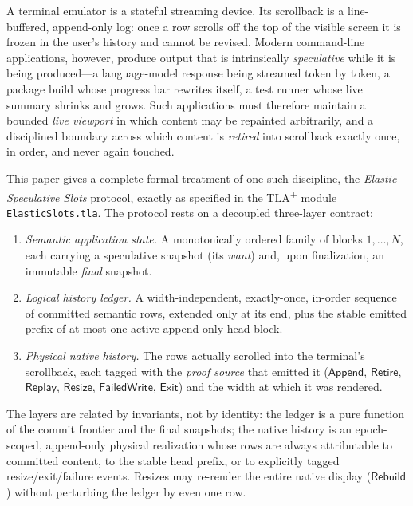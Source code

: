 \documentclass[11pt]{article}
\newcommand{\Rebuild}{\mathsf{Rebuild}}
\newcommand{\srcApp}{\mathsf{Append}}
\newcommand{\srcRet}{\mathsf{Retire}}
\newcommand{\srcRep}{\mathsf{Replay}}
\newcommand{\srcRsz}{\mathsf{Resize}}
\newcommand{\srcFail}{\mathsf{FailedWrite}}
\newcommand{\srcExit}{\mathsf{Exit}}
\theoremstyle{definition}
\theoremstyle{remark}
\begin{document}
A terminal emulator is a stateful streaming device. Its scrollback is a
line-buffered, append-only log: once a row scrolls off the top of the visible
screen it is frozen in the user's history and cannot be revised. Modern
command-line applications, however, produce output that is intrinsically
\emph{speculative} while it is being produced---a language-model response
being streamed token by token, a package build whose progress bar rewrites
itself, a test runner whose live summary shrinks and grows. Such applications
must therefore maintain a bounded \emph{live viewport} in which content may be
repainted arbitrarily, and a disciplined boundary across which content is
\emph{retired} into scrollback exactly once, in order, and never again
touched.

This paper gives a complete formal treatment of one such discipline, the
\emph{Elastic Speculative Slots} protocol, exactly as specified in the
TLA\textsuperscript{+} module \texttt{ElasticSlots.tla}. The protocol rests on
a decoupled three-layer contract:

\begin{enumerate}
\item \emph{Semantic application state.} A monotonically ordered family of
  blocks $1,\dots,N$, each carrying a speculative snapshot (its \emph{want})
  and, upon finalization, an immutable \emph{final} snapshot.
\item \emph{Logical history ledger.} A width-independent, exactly-once,
  in-order sequence of committed semantic rows, extended only at its end, plus
  the stable emitted prefix of at most one active append-only head block.
\item \emph{Physical native history.} The rows actually scrolled into the
  terminal's scrollback, each tagged with the \emph{proof source} that emitted
  it ($\srcApp$, $\srcRet$, $\srcRep$, $\srcRsz$, $\srcFail$, $\srcExit$) and
  the width at which it was rendered.
\end{enumerate}

The layers are related by invariants, not by identity: the ledger is a pure
function of the commit frontier and the final snapshots; the native history is
an epoch-scoped, append-only physical realization whose rows are always
attributable to committed content, to the stable head prefix, or to explicitly
tagged resize/exit/failure events. Resizes may re-render the entire native
display ($\Rebuild$) without perturbing the ledger by even one row.
\end{document}
